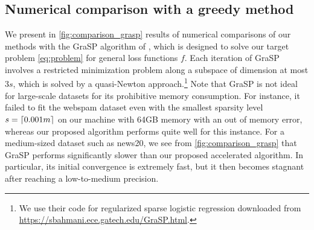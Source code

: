 \documentclass{article}
\newcommand{\alert}[1]{{#1}}
\newcommand{\alertt}[1]{{#1}}
\theoremstyle{plain}
\theoremstyle{definition}
\theoremstyle{remark}
\newcommand*{\lmss}{\fontfamily{lmss}\selectfont}
\DeclarePairedDelimiter{\ceil}{\lceil}{\rceil}
\def\news{{\lmss news20}\xspace}
\def\webspam{{\lmss webspam}\xspace}
\begin{document}
\subsection{\alert{Numerical comparison with a greedy method}}
\label{sec:comparison_greedy}
\alert{
We present in \cref{fig:comparison_grasp} results of numerical
comparisons of our methods with the GraSP algorithm of
\citet{BahRB13a}, which is designed to solve our target problem \cref{eq:problem} 
for general loss functions $f$. Each iteration of GraSP involves a restricted 
minimization problem along a subspace of dimension at most $3s$, which is 
solved by a quasi-Newton approach.\footnote{We use their code for regularized
	sparse logistic regression downloaded
	from \url{https://sbahmani.ece.gatech.edu/GraSP.html}.} Note that
	GraSP is not 
ideal for large-scale datasets for its prohibitive memory consumption. For instance, it failed to fit the \webspam 
dataset even with the smallest sparsity level $s=\ceil{0.001m}$ \alertt{on our
machine with 64GB memory with an out of memory error}, whereas our 
proposed algorithm performs quite well for this instance. For a medium-sized 
dataset such as \news, we see from \cref{fig:comparison_grasp} that GraSP 
performs significantly slower than our proposed accelerated algorithm.
\alertt{In particular, its initial convergence is extremely fast, but it then
becomes stagnant after reaching a low-to-medium precision.}}
\end{document}
